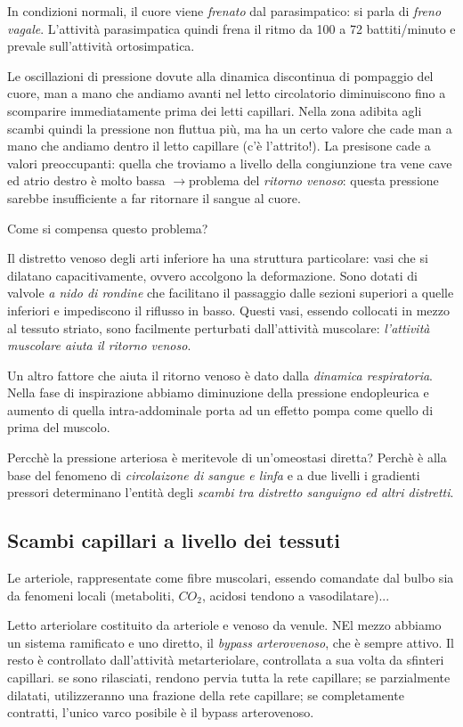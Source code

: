 \documentclass[a4paper,12pt]{article}
\newcommand{\lfreccia}{\ensuremath{\longrightarrow}}
\begin{document}
In condizioni normali, il cuore viene \emph{frenato} dal parasimpatico: si parla di \emph{freno vagale}. L'attività parasimpatica quindi frena il ritmo da 100 a 72 battiti/minuto e prevale sull'attività ortosimpatica.

Le oscillazioni di pressione dovute alla dinamica discontinua di pompaggio del cuore, man a mano che andiamo avanti nel letto circolatorio diminuiscono fino a scomparire immediatamente prima dei letti capillari. Nella zona adibita agli scambi quindi la pressione non fluttua più, ma ha un certo valore che cade man a mano che andiamo dentro il letto capillare (c'è l'attrito!). La presisone cade a valori preoccupanti: quella che troviamo a livello della congiunzione tra vene cave ed atrio destro è molto bassa \lfreccia problema del \emph{ritorno venoso}: questa pressione sarebbe insufficiente a far ritornare il sangue al cuore.

Come si compensa questo problema?

Il distretto venoso degli arti inferiore ha una struttura particolare: vasi che si dilatano capacitivamente, ovvero accolgono la deformazione. Sono dotati di valvole \emph{a nido di rondine} che facilitano il passaggio dalle sezioni superiori a quelle inferiori e impediscono il riflusso in basso. Questi vasi, essendo collocati in mezzo al tessuto striato, sono facilmente perturbati dall'attività muscolare: \emph{l'attività muscolare aiuta il ritorno venoso}.

Un altro fattore che aiuta il ritorno venoso è dato dalla \emph{dinamica respiratoria}. Nella fase di inspirazione abbiamo diminuzione della pressione endopleurica e aumento di quella intra-addominale porta ad un effetto pompa come quello di prima del muscolo.

Percchè la pressione arteriosa è meritevole di un'omeostasi diretta?
Perchè è alla base del fenomeno di \emph{circolaizone di sangue e linfa} e a due livelli i gradienti pressori determinano l'entità degli \emph{scambi tra distretto sanguigno ed altri distretti}.

\subsection{Scambi capillari a livello dei tessuti}
Le arteriole, rappresentate come fibre muscolari, essendo comandate dal bulbo sia da fenomeni locali (metaboliti, $CO_{2}$, acidosi tendono a vasodilatare)...

Letto arteriolare costituito da arteriole e venoso da venule. NEl mezzo abbiamo un sistema ramificato e uno diretto, il \emph{bypass arterovenoso}, che è sempre attivo. Il resto è controllato dall'attività metarteriolare, controllata a sua volta da sfinteri capillari. se sono rilasciati, rendono pervia tutta la rete capillare; se parzialmente dilatati, utilizzeranno una frazione della rete capillare; se completamente contratti, l'unico varco posibile è il bypass arterovenoso.
\end{document}
